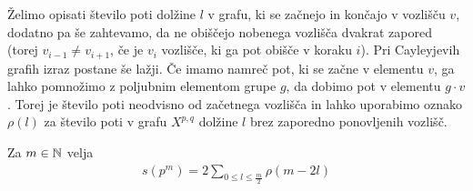 Želimo opisati število poti dolžine \(l\) v grafu, ki se začnejo in končajo v vozlišču \(v\), dodatno pa še zahtevamo, da ne obiščejo nobenega vozlišča dvakrat zapored (torej \(v_{i-1}\neq v_{i+1}\), če je \(v_i\) vozlišče, ki ga pot obišče v koraku \(i\)). Pri Cayleyjevih grafih izraz postane še lažji. Če imamo namreč pot, ki se začne v elementu \(v\), ga lahko pomnožimo z poljubnim elementom grupe \(g\), da dobimo pot v elementu \(g\cdot v\). Torej je število poti neodvisno od začetnega vozlišča in lahko uporabimo oznako \(\rho(l)\) za število poti v grafu \(X^{p,q}\) dolžine \(l\) brez zaporedno ponovljenih vozlišč.

\begin{izrek}
    Za \(m\in \mathbb N\) velja
    \begin{align*}
        s(p^m) = 2\sum_{0\leq l\leq \frac{m}{2}}\rho(m-2l)
    \end{align*}
\end{izrek}
